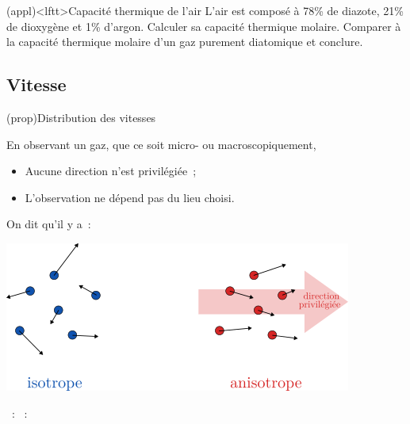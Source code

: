 \documentclass[../../main/main.tex]{subfiles}
\begin{document}
\begin{tcb}[breakable](appl)<lftt>{Capacité thermique de l'air}
	L'air est composé à 78\% de diazote, 21\% de dioxygène et 1\% d'argon.
	Calculer sa capacité thermique molaire. Comparer à la capacité thermique
	molaire d'un gaz purement diatomique et conclure.
	\tcblower
	\vspace{-20pt}
\end{tcb}

\subsection{Vitesse}
\begin{tcb*}[breakable](prop){Distribution des vitesses}
	\noindent
	\begin{minipage}[c]{.57\linewidth}
		En observant un gaz, que ce soit micro- ou macroscopiquement,
		\begin{itemize}
			\item Aucune direction n'est privilégiée~;
			\item L'observation ne dépend pas du lieu choisi.
		\end{itemize}
		On dit qu'il y a~:
	\end{minipage}
	\begin{minipage}[c]{.40\linewidth}
		\begin{center}
			\includegraphics[width=\linewidth]{vitesse_iso}
		\end{center}
	\end{minipage}
	\begin{itemize}
		~: 
		~: 
	\end{itemize}
\end{tcb*}
\end{document}
